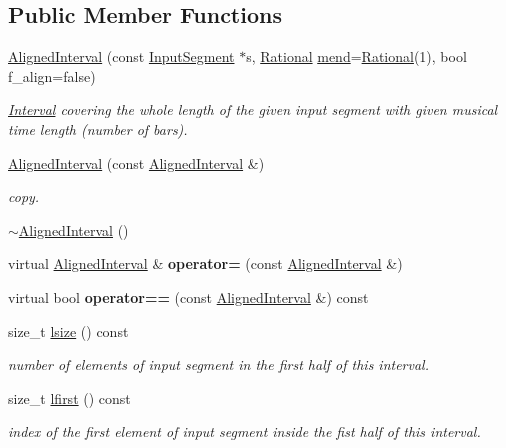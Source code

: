 \subsection*{Public Member Functions}
\begin{DoxyCompactItemize}
\item 
\mbox{\hyperlink{group__segment_ga7e9399ce64bb21aa2d2c3cd682ca95da}{Aligned\+Interval}} (const \mbox{\hyperlink{classInputSegment}{Input\+Segment}} $\ast$s, \mbox{\hyperlink{classRational}{Rational}} \mbox{\hyperlink{classInterval_a963b9b36f085a7db9c159c55608f8408}{mend}}=\mbox{\hyperlink{classRational}{Rational}}(1), bool f\+\_\+align=false)
\begin{DoxyCompactList}\small\item\em \mbox{\hyperlink{classInterval}{Interval}} covering the whole length of the given input segment with given musical time length (number of bars). \end{DoxyCompactList}\item 
\mbox{\hyperlink{group__segment_ga5bf2bf3fe1a1791989ec52969aace0a5}{Aligned\+Interval}} (const \mbox{\hyperlink{classAlignedInterval}{Aligned\+Interval}} \&)
\begin{DoxyCompactList}\small\item\em copy. \end{DoxyCompactList}\item 
\mbox{\hyperlink{classAlignedInterval_ae327b28af603aaffbe9bc8480c6e2109}{$\sim$\+Aligned\+Interval}} ()
\item 
virtual \mbox{\hyperlink{classAlignedInterval}{Aligned\+Interval}} \& {\bfseries operator=} (const \mbox{\hyperlink{classAlignedInterval}{Aligned\+Interval}} \&)
\item 
virtual bool {\bfseries operator==} (const \mbox{\hyperlink{classAlignedInterval}{Aligned\+Interval}} \&) const
\item 
size\+\_\+t \mbox{\hyperlink{classAlignedInterval_a260f8eead747a05642d7b5d720d02e5b}{lsize}} () const
\begin{DoxyCompactList}\small\item\em number of elements of input segment in the first half of this interval. \end{DoxyCompactList}\item 
size\+\_\+t \mbox{\hyperlink{classAlignedInterval_a85114f9883305f0cf975dbdffff41772}{lfirst}} () const
\begin{DoxyCompactList}\small\item\em index of the first element of input segment inside the fist half of this interval. \end{DoxyCompactList}\item 

\end{DoxyCompactItemize}
